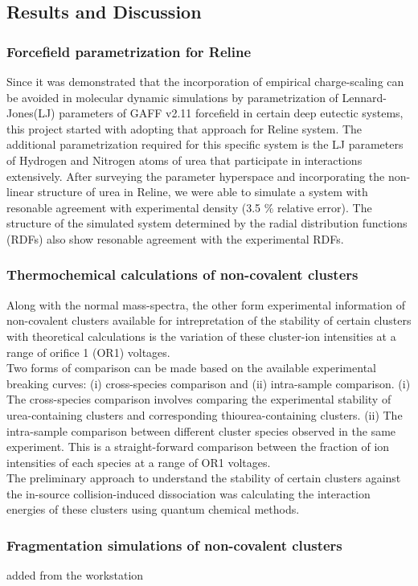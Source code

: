 \subsection*{Results and Discussion}
\subsubsection*{Forcefield parametrization for Reline}
Since it was demonstrated that the incorporation of empirical charge-scaling can be avoided in molecular dynamic simulations by parametrization of Lennard-Jones(LJ) parameters of GAFF v2.11 forcefield in certain deep eutectic systems, this project started with adopting that approach for Reline system.
The additional parametrization required for this specific system is the LJ parameters of Hydrogen and Nitrogen atoms of urea that participate in interactions extensively. After surveying the parameter hyperspace and incorporating the non-linear structure of urea in Reline, we were able to simulate a system with resonable agreement with experimental density (3.5 $\%$ relative error). The structure of the simulated system determined by the radial distribution functions (RDFs) also show resonable agreement with the experimental RDFs.
\subsubsection*{Thermochemical calculations of non-covalent clusters}
Along with the normal mass-spectra, the other form experimental information of non-covalent clusters available for intrepretation of the stability of certain clusters with theoretical calculations is the variation of these cluster-ion intensities at a range of orifice 1 (OR1) voltages.
 \\ Two forms of comparison can be made based on the available experimental breaking curves: (i) cross-species comparison and (ii) intra-sample comparison. (i) The cross-species comparison involves comparing the experimental stability of urea-containing clusters and corresponding thiourea-containing clusters. (ii) The intra-sample comparison between different cluster species observed in the same experiment. This is a straight-forward comparison between the fraction of ion intensities of each species at a range of OR1 voltages.
\\
 The preliminary approach to understand the stability of certain clusters against the in-source collision-induced dissociation was calculating the interaction energies of these clusters using quantum chemical methods. \\

\subsubsection*{Fragmentation simulations of non-covalent clusters}
added from the workstation